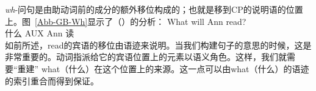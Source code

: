 \emph{wh}-问句是由助动词前的成分的额外移位构成的；也就是移到CP的说明语的位置上。图~\vref{Abb-GB-Wh}显示了（）的分析：
\ea
\gll What will Ann read?\\
      什么 AUX Ann 读\\
\z
%
如前所述，read的宾语的移位由语迹来说明。当我们构建句子的意思的时候，这是非常重要的。动词指派给它的宾语位置上的元素以语义角色。这样，我们就需要``重建'' what（什么）在这个位置上的来源。这一点可以由what（什么）的语迹的索引重合而得到保证。


